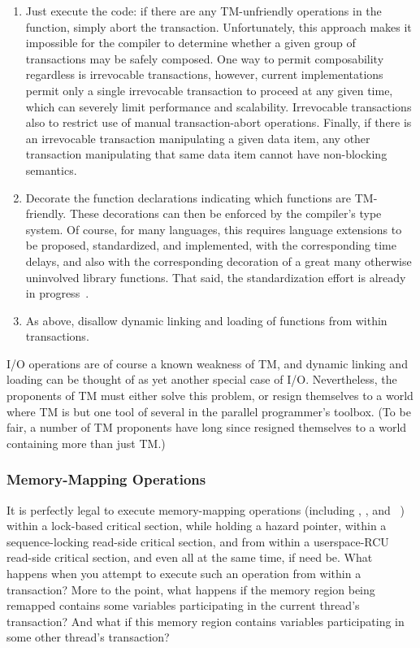 \begin{enumerate}
\item	Just execute the code: if there are any TM-unfriendly operations
	in the function, simply abort the transaction.
	Unfortunately, this approach makes it impossible for the compiler
	to determine whether a given group of transactions may be safely
	composed.
	One way to permit composability regardless is irrevocable
	transactions, however, current implementations permit only a
	single irrevocable transaction to proceed at any given time,
	which can severely limit performance and scalability.
	Irrevocable transactions also to restrict use of manual
	transaction-abort operations.
	Finally, if there is an irrevocable transaction manipulating
	a given data item, any other transaction manipulating that
	same data item cannot have non-blocking semantics.
\item	Decorate the function declarations indicating which functions
	are TM-friendly.
	These decorations can then be enforced by the compiler's type system.
	Of course, for many languages, this requires language extensions
	to be proposed, standardized, and implemented, with the
	corresponding time delays, and also with the corresponding
	decoration of a great many otherwise uninvolved library functions.
	That said, the standardization effort is already in
	progress~\cite{Ali-Reza-Adl-Tabatabai2009CppTM}.
\item	As above, disallow dynamic linking and loading of functions from
	within transactions.
\end{enumerate}

I/O operations are of course a known weakness of TM, and dynamic linking
and loading can be thought of as yet another special case of I/O\@.
Nevertheless, the proponents of TM must either solve this problem, or
resign themselves to a world where TM is but one tool of several in the
parallel programmer's toolbox.
(To be fair, a number of TM proponents have long since resigned themselves
to a world containing more than just TM.)

\subsubsection{Memory-Mapping Operations}
\label{sec:future:Memory-Mapping Operations}

It is perfectly legal to execute memory-mapping operations (including
, , and ~\cite{TheOpenGroup1997SUS})
within a lock-based critical section, while holding a hazard pointer,
within a sequence-locking read-side critical section, and from within a
userspace-RCU read-side critical section, and even all at the same time,
if need be.
What happens when you attempt to execute such an operation from within
a transaction?
More to the point, what happens if the memory region being remapped
contains some variables participating in the current thread's transaction?
And what if this memory region contains variables participating in some
other thread's transaction?

